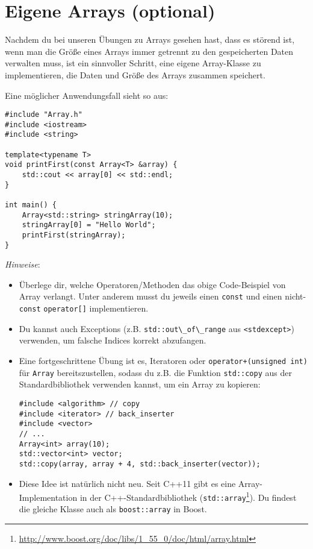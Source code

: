 \section{Eigene Arrays (optional)}
\label{sec:array}

Nachdem du bei unseren Übungen zu Arrays gesehen hast, dass es störend ist, wenn man die Größe eines Arrays immer getrennt zu den gespeicherten Daten verwalten muss, ist ein sinnvoller Schritt, eine eigene Array-Klasse zu implementieren, die Daten und Größe des Arrays zusammen speichert.

Eine möglicher Anwendungsfall sieht so aus:

\begin{lstlisting}
#include "Array.h"
#include <iostream>
#include <string>

template<typename T>
void printFirst(const Array<T> &array) {
    std::cout << array[0] << std::endl;
}

int main() {
    Array<std::string> stringArray(10);
    stringArray[0] = "Hello World";
    printFirst(stringArray);
}
\end{lstlisting}

\emph{Hinweise}:
\begin{itemize}
\item
Überlege dir, welche Operatoren/Methoden das obige Code-Beispiel von Array verlangt.
Unter anderem musst du jeweils einen \lstinline{const} und einen nicht-\lstinline{const} \lstinline{operator[]} implementieren.

\item
Du kannst auch Exceptions (z.B. \lstinline{std::out\_of\_range} aus \lstinline{<stdexcept>}) verwenden, um falsche Indices korrekt abzufangen.

\item
Eine fortgeschrittene Übung ist es, Iteratoren oder \lstinline{operator+(unsigned int)} für \lstinline|Array| bereitszustellen, sodass du z.B. die Funktion \lstinline{std::copy} aus der Standardbibliothek verwenden kannst, um ein Array zu kopieren:
\begin{lstlisting}
#include <algorithm> // copy
#include <iterator> // back_inserter
#include <vector>
// ...
Array<int> array(10);
std::vector<int> vector;
std::copy(array, array + 4, std::back_inserter(vector));
\end{lstlisting}

\item
Diese Idee ist natürlich nicht neu.
Seit C++11 gibt es eine Array-Implementation in der C++-Standardbibliothek (\lstinline{std::array}\footnote{\url{http://www.boost.org/doc/libs/1_55_0/doc/html/array.html}}).
Du findest die gleiche Klasse auch als \lstinline{boost::array} in Boost.
\end{itemize}
